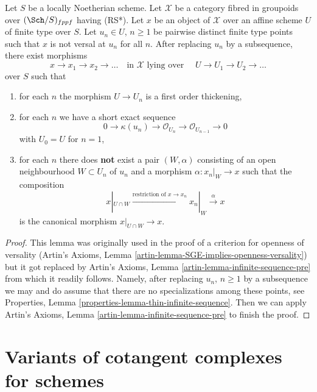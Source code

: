 \begin{lemma}
\label{lemma-infinite-sequence}
Let $S$ be a locally Noetherian scheme. Let $\mathcal{X}$ be a category
fibred in groupoids over $(\Sch/S)_{fppf}$ having (RS*).
Let $x$ be an object of
$\mathcal{X}$ over an affine scheme $U$ of finite type over $S$.
Let $u_n \in U$, $n \geq 1$ be pairwise distinct finite type points
such that $x$ is not versal at $u_n$ for all $n$. After replacing
$u_n$ by a subsequence, there exist morphisms
$$
x \to x_1 \to x_2 \to \ldots
\quad\text{in }\mathcal{X}\text{ lying over }\quad
U \to U_1 \to U_2 \to \ldots
$$
over $S$ such that
\begin{enumerate}
\item for each $n$ the morphism $U \to U_n$ is a first order
thickening,
\item for each $n$ we have a short exact sequence
$$
0 \to \kappa(u_n) \to \mathcal{O}_{U_n} \to \mathcal{O}_{U_{n - 1}} \to 0
$$
with $U_0 = U$ for $n = 1$,
\item for each $n$ there does {\bf not} exist a pair $(W, \alpha)$
consisting of an open neighbourhood $W \subset U_n$ of $u_n$
and a morphism $\alpha : x_n|_W \to x$
such that the composition
$$
x|_{U \cap W} \xrightarrow{\text{restriction of }x \to x_n}
x_n|_W \xrightarrow{\alpha} x
$$
is the canonical morphism $x|_{U \cap W} \to x$.
\end{enumerate}
\end{lemma}

\begin{proof}
This lemma was originally used in the proof of a criterion for
openness of versality
(Artin's Axioms, Lemma \ref{artin-lemma-SGE-implies-openness-versality}) but it
got replaced by Artin's Axioms, Lemma \ref{artin-lemma-infinite-sequence-pre}
from which it readily follows. Namely,
after replacing $u_n$, $n \geq 1$ by a subsequence we may and do
assume that there are no specializations among these points, see
Properties, Lemma \ref{properties-lemma-thin-infinite-sequence}.
Then we can apply
Artin's Axioms, Lemma \ref{artin-lemma-infinite-sequence-pre}
to finish the proof.
\end{proof}







\section{Variants of cotangent complexes for schemes}
\label{section-cotangent-schemes-variant}

